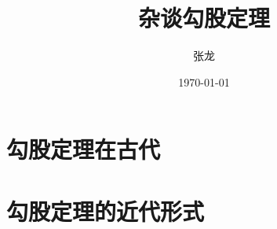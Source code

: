 \documentclass[UTF8]{ctexart}
\title{杂谈勾股定理}
\author{张龙}
\date{\today}
\begin{document}
\maketitle
\tableofcontents

\section{勾股定理在古代}
\section{勾股定理的近代形式}
\end{document}
